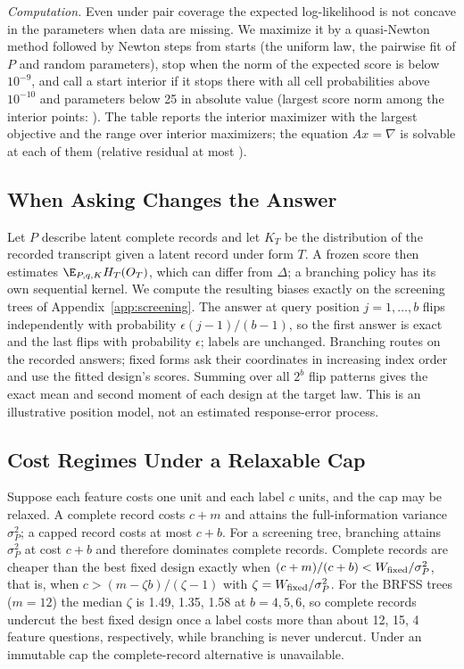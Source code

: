 \emph{Computation.} Even under pair coverage the expected log-likelihood is not concave in the parameters when data are missing. We maximize it by a quasi-Newton method followed by Newton steps from \nMisStarts{} starts (the uniform law, the pairwise fit of $P$ and random parameters), stop when the norm of the expected score is below $10^{-9}$, and call a start interior if it stops there with all cell probabilities above $10^{-10}$ and parameters below 25 in absolute value (largest score norm among the interior points: \nMisGnorm). The table reports the interior maximizer with the largest objective and the range over interior maximizers; the equation $Ax=\nabla$ is solvable at each of them (relative residual at most \nMisResid).

\nMisspecAppendixText

\subsection{When Asking Changes the Answer}\label{app:measurement}
Let $P$ describe latent complete records and let $K_T$ be the distribution of the recorded transcript given a latent record under form $T$. A frozen score then estimates $\E_{P,q,K}H_T(O_T)$, which can differ from $\Delta$; a branching policy has its own sequential kernel. We compute the resulting biases exactly on the screening trees of Appendix~\ref{app:screening}. The answer at query position $j=1,\ldots,b$ flips independently with probability $\epsilon(j-1)/(b-1)$, so the first answer is exact and the last flips with probability $\epsilon$; labels are unchanged. Branching routes on the recorded answers; fixed forms ask their coordinates in increasing index order and use the fitted design's scores. Summing over all $2^b$ flip patterns gives the exact mean and second moment of each design at the target law. This is an illustrative position model, not an estimated response-error process.


\subsection{Cost Regimes Under a Relaxable Cap}\label{app:costchoice}
Suppose each feature costs one unit and each label $c$ units, and the cap may be relaxed. A complete record costs $c+m$ and attains the full-information variance $\sigma_P^2$; a capped record costs at most $c+b$. For a screening tree, branching attains $\sigma_P^2$ at cost $c+b$ and therefore dominates complete records. Complete records are cheaper than the best fixed design exactly when $(c+m)/(c+b)<W_{\rm fixed}/\sigma_P^2$, that is, when $c>(m-\zeta b)/(\zeta-1)$ with $\zeta=W_{\rm fixed}/\sigma_P^2$. For the BRFSS trees ($m=12$) the median $\zeta$ is 1.49, 1.35, 1.58 at $b=4, 5, 6$, so complete records undercut the best fixed design once a label costs more than about 12, 15, 4 feature questions, respectively, while branching is never undercut. Under an immutable cap the complete-record alternative is unavailable.
